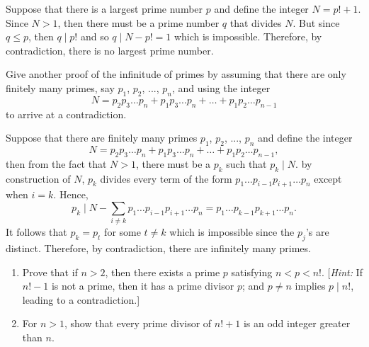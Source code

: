 \begin{solution}
    Suppose that there is a largest prime number $p$ and define the integer $N = p! + 1$. Since $N > 1$, then there must be a prime number $q$ that divides $N$. But since $q \leq p$, then $q \mid p!$ and so $q \mid N - p! = 1$ which is impossible. Therefore, by contradiction, there is no largest prime number. \\
\end{solution}

\begin{exercise}
    Give another proof of the infinitude of primes by assuming that there are only finitely many primes, say $p_1$, $p_2$, ..., $p_n$, and using the integer
    $$N = p_2p_3\dots p_n + p_1p_3\dots p_n + \dots + p_1p_2\dots p_{n-1}$$
    to arrive at a contradiction. \\
\end{exercise}

\begin{solution}
    Suppose that there are finitely many primes $p_1$, $p_2$, ..., $p_n$ and define the integer  
    $$N = p_2p_3\dots p_n + p_1p_3\dots p_n + \dots + p_1p_2\dots p_{n-1},$$
    then from the fact that $N > 1$, there must be a $p_k$ such that $p_k \mid N$. by construction of $N$, $p_k$ divides every term of the form $p_1 \dots p_{i-1} p_{i+1} \dots p_n$ except when $i = k$. Hence,
    $$p_k \mid N - \sum_{i\neq k}p_1 \dots p_{i-1} p_{i+1} \dots p_n = p_1 \dots p_{k-1} p_{k+1} \dots p_n.$$
    It follows that $p_k = p_t$ for some $t \neq k$ which is impossible since the $p_j$'s are distinct. Therefore, by contradiction, there are infinitely many primes. \\
\end{solution}

\begin{exercise}
    \begin{enumerate}
        \item Prove that if $n > 2$, then there exists a prime $p$ satisfying $n < p < n!$. [\textit{Hint:} If $n! - 1$ is not a prime, then it has a prime divisor $p$; and $p \neq n$ implies $p \mid n!$, leading to a contradiction.] 
        \item For $n > 1$, show that every prime divisor of $n! + 1$ is an odd integer greater than $n$.
    \end{enumerate}
\end{exercise}

